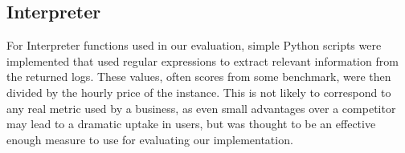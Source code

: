 \documentclass{article}
\begin{document}
\subsection{Interpreter}
For Interpreter functions used in our evaluation, simple Python scripts were implemented that used regular expressions to extract relevant information from the returned logs. These values, often scores from some benchmark, were then divided by the hourly price of the instance.
This is not likely to correspond to any real metric used by a business, as even small advantages over a competitor may lead to a dramatic uptake in users, but was thought to be an effective enough measure to use for evaluating our implementation.


\newpage

\end{document}
